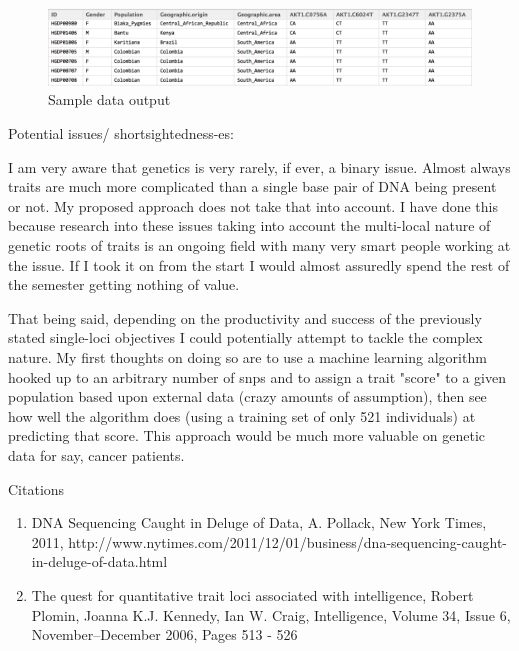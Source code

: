 \documentclass{scrartcl}
\begin{document}
\begin{figure}[h!]
  \caption{Sample data output}
  \centering
   \includegraphics[scale = .5]{figures/sampleOutput.png}
\end{figure}

\vspace{1em}
{\Large Potential issues/ shortsightedness-es:}
\vspace{.7em}

I am very aware that genetics is very rarely, if ever, a binary issue. Almost always traits are much more complicated than a single base pair of DNA being present or not. My proposed approach does not take that into account. I have done this because research into these issues taking into account the multi-local nature of genetic roots of traits is an ongoing field with many very smart people working at the issue. If I took it on from the start I would almost assuredly spend the rest of the semester getting nothing of value. 
\vspace{.5em}

That being said, depending on the productivity and success of the previously stated single-loci objectives I could potentially attempt to tackle the complex nature. My first thoughts on doing so are to use a machine learning algorithm hooked up to an arbitrary number of snps and to assign a trait "score" to a given population based upon external data (crazy amounts of assumption), then see how well the algorithm does (using a training set of only 521 individuals) at predicting that score. This approach would be much more valuable on genetic data for say, cancer patients. 




\vspace{10em}
{\Large Citations}
\begin{enumerate}
\item DNA Sequencing Caught in Deluge of Data, A. Pollack, New York Times, 2011,
http://www.nytimes.com/2011/12/01/business/dna-sequencing-caught-in-deluge-of-data.html

\item The quest for quantitative trait loci associated with intelligence, Robert Plomin, Joanna K.J. Kennedy, Ian W. Craig, Intelligence, Volume 34, Issue 6, November–December 2006, Pages 513 - 526

\end{enumerate}
\end{document}
